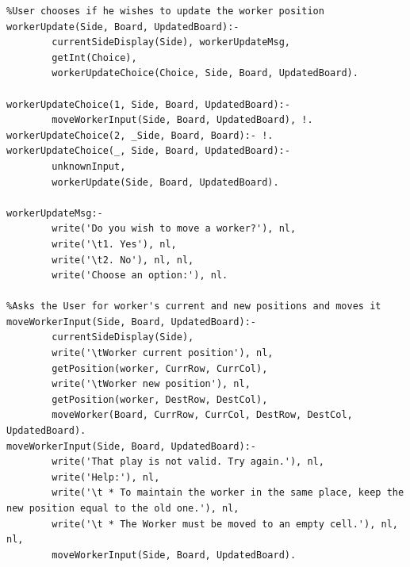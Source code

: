 \documentclass[a4paper]{article}
\begin{document}
\begin{lstlisting}
%User chooses if he wishes to update the worker position
workerUpdate(Side, Board, UpdatedBoard):-
        currentSideDisplay(Side), workerUpdateMsg,
        getInt(Choice),
        workerUpdateChoice(Choice, Side, Board, UpdatedBoard).

workerUpdateChoice(1, Side, Board, UpdatedBoard):-
        moveWorkerInput(Side, Board, UpdatedBoard), !.
workerUpdateChoice(2, _Side, Board, Board):- !.
workerUpdateChoice(_, Side, Board, UpdatedBoard):-
        unknownInput,
        workerUpdate(Side, Board, UpdatedBoard).

workerUpdateMsg:-
        write('Do you wish to move a worker?'), nl,
        write('\t1. Yes'), nl,
        write('\t2. No'), nl, nl,
        write('Choose an option:'), nl.

%Asks the User for worker's current and new positions and moves it
moveWorkerInput(Side, Board, UpdatedBoard):-
        currentSideDisplay(Side),
        write('\tWorker current position'), nl,
        getPosition(worker, CurrRow, CurrCol),
        write('\tWorker new position'), nl,
        getPosition(worker, DestRow, DestCol),
        moveWorker(Board, CurrRow, CurrCol, DestRow, DestCol, UpdatedBoard).
moveWorkerInput(Side, Board, UpdatedBoard):-
        write('That play is not valid. Try again.'), nl, 
        write('Help:'), nl,
        write('\t * To maintain the worker in the same place, keep the new position equal to the old one.'), nl,
        write('\t * The Worker must be moved to an empty cell.'), nl, nl,
        moveWorkerInput(Side, Board, UpdatedBoard).
\end{lstlisting}
\newpage
\end{document}
